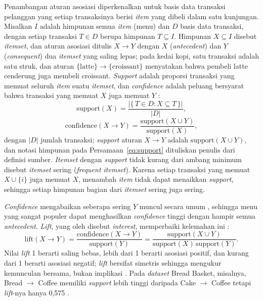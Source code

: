 Penambangan aturan asosiasi diperkenalkan \citet*{agrawal1993mining} untuk basis data transaksi pelanggan yang setiap transaksinya berisi \textit{item} yang dibeli dalam satu kunjungan. Misalkan $I$ adalah himpunan semua \textit{item} (menu) dan $D$ basis data transaksi, dengan setiap transaksi $T \in D$ berupa himpunan $T \subseteq I$. Himpunan $X \subseteq I$ disebut \textit{itemset}, dan aturan asosiasi ditulis $X \rightarrow Y$ dengan $X$ (\textit{antecedent}) dan $Y$ (\textit{consequent}) dua \textit{itemset} yang saling lepas; pada kedai kopi, satu transaksi adalah satu struk, dan aturan $\{\text{latte}\} \rightarrow \{\text{croissant}\}$ menyatakan bahwa pembeli latte cenderung juga membeli croissant. \textit{Support} adalah proporsi transaksi yang memuat seluruh \textit{item} suatu \textit{itemset}, dan \textit{confidence} adalah peluang bersyarat bahwa transaksi yang memuat $X$ juga memuat $Y$ \citep*{agrawal1993mining, brin1997dynamic, sihombing2026analisis}:
\begin{equation}
\mathrm{support}(X) = \frac{\left|\{\, T \in D : X \subseteq T \,\}\right|}{|D|},
\label{eq:support}
\end{equation}
\begin{equation}
\mathrm{confidence}(X \rightarrow Y) = \frac{\mathrm{support}(X \cup Y)}{\mathrm{support}(X)},
\label{eq:confidence}
\end{equation}
dengan $|D|$ jumlah transaksi; \textit{support} aturan $X \rightarrow Y$ adalah $\mathrm{support}(X \cup Y)$, dan notasi himpunan pada Persamaan~\eqref{eq:support} dituliskan penulis dari definisi sumber. \textit{Itemset} dengan \textit{support} tidak kurang dari ambang minimum disebut \textit{itemset} sering (\textit{frequent itemset}). Karena setiap transaksi yang memuat $X \cup \{i\}$ juga memuat $X$, menambah \textit{item} tidak dapat menaikkan \textit{support}, sehingga setiap himpunan bagian dari \textit{itemset} sering juga sering.

\textit{Confidence} mengabaikan seberapa sering $Y$ muncul secara umum \citep*{brin1997dynamic}, sehingga menu yang sangat populer dapat menghasilkan \textit{confidence} tinggi dengan hampir semua \textit{antecedent}. \textit{Lift}, yang oleh \citet*{brin1997dynamic} disebut \textit{interest}, memperbaiki kelemahan ini \citep*{brin1997dynamic, sihombing2026analisis}:
\begin{equation}
\mathrm{lift}(X \rightarrow Y) = \frac{\mathrm{confidence}(X \rightarrow Y)}{\mathrm{support}(Y)} = \frac{\mathrm{support}(X \cup Y)}{\mathrm{support}(X)\,\mathrm{support}(Y)}.
\label{eq:lift}
\end{equation}
Nilai \textit{lift} 1 berarti saling bebas, lebih dari 1 berarti asosiasi positif, dan kurang dari 1 berarti asosiasi negatif; \textit{lift} bersifat simetris sehingga mengukur kemunculan bersama, bukan implikasi \citep*{brin1997dynamic}. Pada \textit{dataset} Bread Basket, misalnya, Bread $\rightarrow$ Coffee memiliki \textit{support} lebih tinggi daripada Cake $\rightarrow$ Coffee tetapi \textit{lift}-nya hanya 0,575 \citep*{sihombing2026analisis}.

